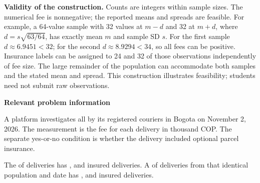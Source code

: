 

\textbf{Validity of the construction.} Counts are integers within sample sizes. The numerical fee is nonnegative; the reported means and spreads are feasible. For example, a 64-value sample with 32 values at $m-d$ and 32 at $m+d$, where $d=s\sqrt{63/64}$, has exactly mean $m$ and sample SD $s$. For the first sample $d\approx6.9451<32$; for the second $d\approx8.9294<34$, so all fees can be positive. Insurance labels can be assigned to 24 and 32 of those observations independently of fee size. The large remainder of the population can accommodate both samples and the stated mean and spread. This construction illustrates feasibility; students need not submit raw observations.

\secInicio[][sec:p3]

\clearpage



\textbf{Relevant problem information}

\begin{probleminfoexcerpt}
A platform investigates all    by its registered couriers in Bogota on November 2, 2026. The measurement is the fee for each delivery in thousand COP. The separate yes-or-no condition is whether the delivery included optional parcel insurance.
\end{probleminfoexcerpt}

\begin{probleminfoexcerpt}
The     of  deliveries has     ,       and  insured deliveries. A     of  deliveries from that identical population and date has     ,       and  insured deliveries.
\end{probleminfoexcerpt}

